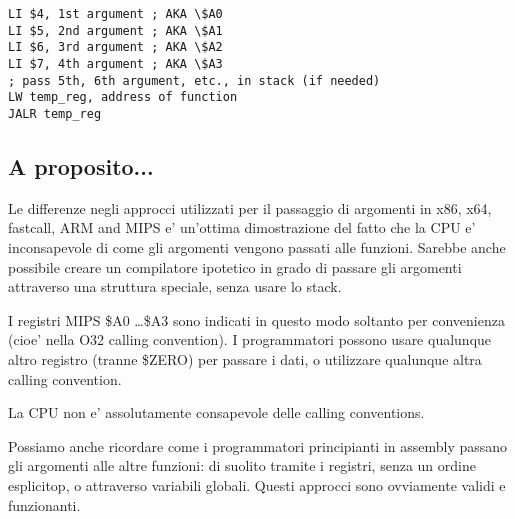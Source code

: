 \begin{lstlisting}[caption=MIPS (O32 calling convention),style=customasmMIPS]
LI $4, 1st argument ; AKA \$A0
LI $5, 2nd argument ; AKA \$A1
LI $6, 3rd argument ; AKA \$A2
LI $7, 4th argument ; AKA \$A3
; pass 5th, 6th argument, etc., in stack (if needed)
LW temp_reg, address of function
JALR temp_reg
\end{lstlisting}

\subsection{A proposito...}

Le differenze negli approcci utilizzati per il passaggio di argomenti in x86, x64, 
fastcall, ARM and MIPS e' un'ottima dimostrazione del fatto che la CPU e' inconsapevole di come gli argomenti vengono passati alle funzioni. 
Sarebbe anche possibile creare un compilatore ipotetico in grado di passare gli argomenti attraverso una struttura speciale, senza usare lo stack.

I registri MIPS \$A0 \dots \$A3 sono indicati in questo modo soltanto per convenienza (cioe' nella O32 calling convention).
I programmatori possono usare qualunque altro registro (tranne \$ZERO) per passare i dati, o utilizzare qualunque altra calling convention. 

La \ac{CPU} non e' assolutamente consapevole delle calling conventions.

Possiamo anche ricordare come i programmatori principianti in assembly passano gli argomenti alle altre funzioni: 
di suolito tramite i registri, senza un ordine esplicitop, o attraverso variabili globali.
Questi approcci sono ovviamente validi e funzionanti.
